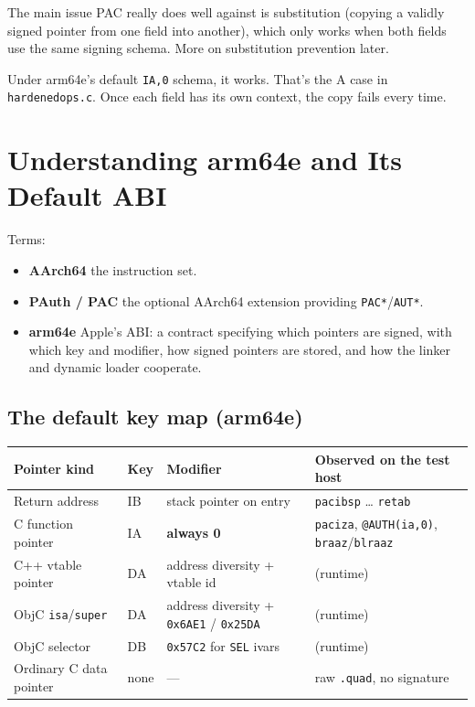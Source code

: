 The main issue PAC really does well against is substitution (copying a validly signed pointer from one field into another), which only works when both fields use the same signing schema. More on substitution prevention later.

Under arm64e's default \texttt{IA,0} schema, it works. That's the A case in \texttt{hardened\uscore{}ops.c}. Once each field has its own context, the copy fails every time.

\section{Understanding arm64e and Its Default ABI}

Terms:

\begin{itemize}
\item \textbf{AArch64} the instruction set.
\item \textbf{PAuth / PAC} the optional AArch64 extension providing \texttt{PAC*}/\texttt{AUT*}.
\item \textbf{arm64e} Apple's ABI: a contract specifying which pointers are signed, with which key and modifier, how signed pointers are stored, and how the linker and dynamic loader cooperate.
\end{itemize}

\subsection{The default key map (arm64e)}

\begin{tabular}{|l|l|l|l|}
\hline
Pointer kind & Key & Modifier & Observed on the test host \\
\hline
Return address & IB & stack pointer on entry & \texttt{pacibsp} \ldots{} \texttt{retab} \\
\hline
C function pointer & IA & \textbf{always 0} & \texttt{paciza}, \texttt{@AUTH(ia,0)}, \texttt{braaz}/\texttt{blraaz} \\
\hline
C++ vtable pointer & DA & address diversity + vtable id & (runtime) \\
\hline
ObjC \texttt{isa}/\texttt{super} & DA & address diversity + \texttt{0x6AE1} / \texttt{0x25DA} & (runtime) \\
\hline
ObjC selector & DB & \texttt{0x57C2} for \texttt{SEL} ivars & (runtime) \\
\hline
Ordinary C data pointer & none & --- & raw \texttt{.quad}, no signature \\
\hline
\end{tabular}

